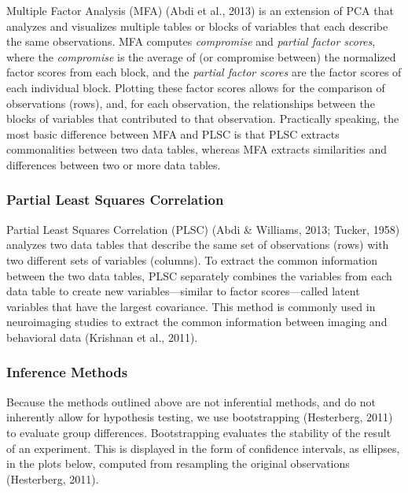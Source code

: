 \documentclass[
  english,
  man,floatsintext]{apa6}
\begin{document}
Multiple Factor Analysis (MFA) (Abdi et al., 2013) is an extension of PCA that analyzes and visualizes multiple tables or blocks of variables that each describe the same observations. MFA computes \emph{compromise} and \emph{partial factor scores}, where the \emph{compromise} is the average of (or compromise between) the normalized factor scores from each block, and the \emph{partial factor scores} are the factor scores of each individual block. Plotting these factor scores allows for the comparison of observations (rows), and, for each observation, the relationships between the blocks of variables that contributed to that observation. Practically speaking, the most basic difference between MFA and PLSC is that PLSC extracts commonalities between two data tables, whereas MFA extracts similarities and differences between two or more data tables.

\hypertarget{partial-least-squares-correlation}{%
\subsubsection{Partial Least Squares Correlation}\label{partial-least-squares-correlation}}

Partial Least Squares Correlation (PLSC) (Abdi \& Williams, 2013; Tucker, 1958) analyzes two data tables that describe the same set of observations (rows) with two different sets of variables (columns). To extract the common information between the two data tables, PLSC separately combines the variables from each data table to create new variables---similar to factor scores---called latent variables that have the largest covariance. This method is commonly used in neuroimaging studies to extract the common information between imaging and behavioral data (Krishnan et al., 2011).

\hypertarget{inference-methods}{%
\subsubsection{Inference Methods}\label{inference-methods}}

Because the methods outlined above are not inferential methods, and do not inherently allow for hypothesis testing, we use bootstrapping (Hesterberg, 2011) to evaluate group differences. Bootstrapping evaluates the stability of the result of an experiment. This is displayed in the form of confidence intervals, as ellipses, in the plots below, computed from resampling the original observations (Hesterberg, 2011).
\end{document}
